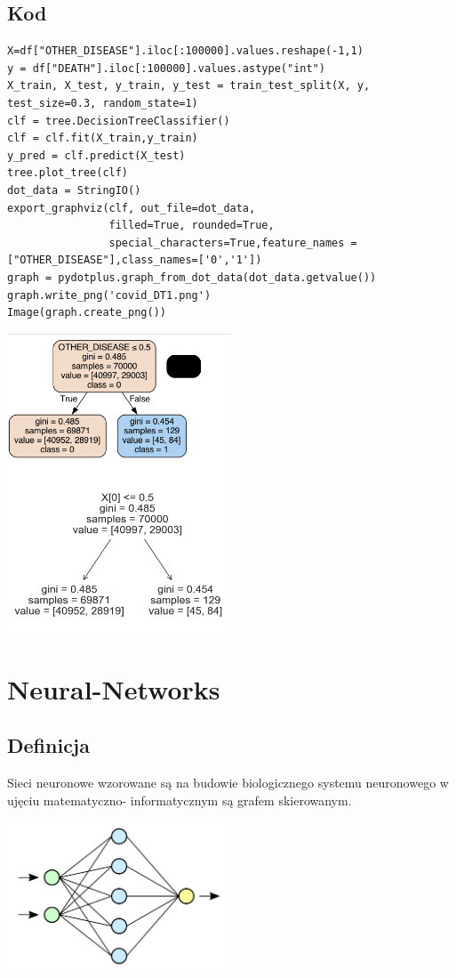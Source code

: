\documentclass{article}
\begin{document}
{\subsection{Kod}
\begin{lstlisting}
X=df["OTHER_DISEASE"].iloc[:100000].values.reshape(-1,1)
y = df["DEATH"].iloc[:100000].values.astype("int")
X_train, X_test, y_train, y_test = train_test_split(X, y, test_size=0.3, random_state=1)
clf = tree.DecisionTreeClassifier()
clf = clf.fit(X_train,y_train)
y_pred = clf.predict(X_test)
tree.plot_tree(clf)
dot_data = StringIO()
export_graphviz(clf, out_file=dot_data,  
                filled=True, rounded=True,
                special_characters=True,feature_names = ["OTHER_DISEASE"],class_names=['0','1'])
graph = pydotplus.graph_from_dot_data(dot_data.getvalue())  
graph.write_png('covid_DT1.png')
Image(graph.create_png())
\end{lstlisting}

    \begin{center}
    \includegraphics[width=0.5\textwidth]{image11.png}\newline
\end{center}

\section{\LARGE{Neural-Networks}}
\subsection{Definicja}
\large{Sieci neuronowe wzorowane są na budowie biologicznego systemu neuronowego w ujęciu matematyczno- informatycznym są grafem skierowanym.}
    \begin{center}
    \includegraphics[width=0.5\textwidth]{neuron.png}\newline
\end{center}
\newpage
}
\end{document}
